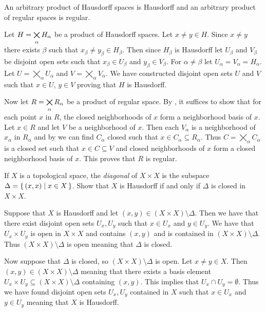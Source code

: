 \documentclass[letterpaper, 11pt]{article}
\begin{document}
\begin{exercise}
  An arbitrary product of Hausdorff spaces is Hausdorff and an arbitrary product of regular spaces is regular.
\end{exercise}
\begin{pf}
  Let $H = \bigtimes\limits_{\alpha} H_{\alpha}$ be a product of Hausdorff spaces.
  Let $x \neq y \in H$.
  Since $x \neq y$ there exists $\beta$ such that $x_{\beta} \neq y_{\beta} \in H_{\beta}$.
  Then since $H_{\beta}$ is Hausdorff let $U_{\beta}$ and $V_{\beta}$ be disjoint open sets such that $x_{\beta} \in U_{\beta}$ and $y_{\beta} \in V_{\beta}$.
  For $\alpha \neq \beta$ let $U_{\alpha} = V_{\alpha} = H_{\alpha}$.
  Let $U = \bigtimes_{\alpha} U_{\alpha}$ and $V = \bigtimes_{\alpha} V_{\alpha}$.
  We have constructed disjoint open sets $U$ and $V$ such that $x \in U$, $y \in V$ proving that $H$ is Hausdorff.

  Now let $R = \bigtimes\limits_{\alpha} R_{\alpha}$ be a product of regular space.
  By , it suffices to show that for each point $x$ in $R$, the closed neighborhoods of $x$ form a neighborhood basis of $x$.
  Let $x \in R$ and let $V$ be a neighborhood of $x$.
  Then each $V_{\alpha}$ is a neighborhood of $x_{\alpha}$ in $R_{\alpha}$ and by  we can find $C_{\alpha}$ closed such that $x \in C_{\alpha} \subseteq R_{\alpha}$.
  Thus $C = \bigtimes_{\alpha} C_{\alpha}$ is a closed set such that $x \in C \subseteq V$ and closed neighborhoods of $x$ form a closed neighborhood basis of $x$.
  This proves that $R$ is regular.
\end{pf}

\begin{exercise}
  If $X$ is a topological space, the \emph{diagonal} of $X \times X$ is the subspace $\Delta = \set{\pqty{x, x} | x \in X}$.
  Show that $X$ is Hausdorff if and only if $\Delta$ is closed in $X \times X$.
\end{exercise}
\begin{pf}
  Suppose that $X$ is Hausdorff and let $(x, y) \in (X \times X) \setminus \Delta$.
  Then we have that there exist disjoint open sets $U_{x}, U_{y}$ such that $x \in U_{x}$ and $y \in U_{y}$.
  We have that $U_{x} \times U_{y}$ is open in $X \times X$ and contains $(x, y)$ and is contained in $(X \times X) \setminus \Delta$.
  Thus $(X \times X) \setminus \Delta$ is open meaning that $\Delta$ is closed.

  Now suppose that $\Delta$ is closed, so $(X \times X) \setminus \Delta$ is open.
  Let $x \neq y \in X$.
  Then $(x, y) \in (X \times X) \setminus \Delta$ meaning that there exists a basis element $U_{x} \times U_{y} \subseteq (X \times X) \setminus \Delta$ containing $(x, y)$.
  This implies that $U_{x} \cap U_{y} = \emptyset$.
  Thus we have found disjoint open sets $U_{x}, U_{y}$ contained in $X$ such that $x \in U_{x}$ and $y \in U_{y}$ meaning that $X$ is Hausdorff.
\end{pf}
\end{document}
